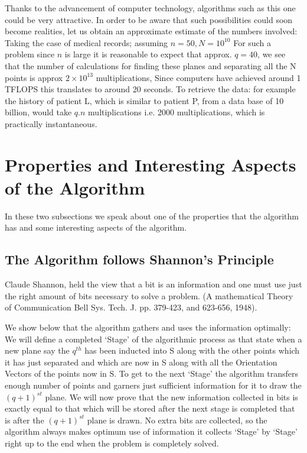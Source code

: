 \documentclass[english]{article}
\begin{document}
Thanks to the advancement of computer technology, algorithms such
as this one could be very attractive. In order to be aware that such
possibilities could soon become realities, let us obtain an approximate
estimate of the numbers involved: Taking the case of medical records;
assuming $n=50,N=10^{10}$ For such a problem since $n$ is large
it is reasonable to expect that approx. $q=40$, we see that the number
of calculations for finding these planes and separating all the N
points is approx $2\times10^{13}$ multiplications, Since computers
have achieved around 1 TFLOPS this translates to around 20 seconds.
To retrieve the data: for example the history of patient L, which
is similar to patient P, from a data base of 10 billion, would take
$q.n$ multiplications i.e. 2000 multiplications, which is practically
instantaneous.


\section{Properties and Interesting Aspects of the Algorithm}

In these two subsections we speak about one of the properties that
the algorithm has and some interesting aspects of the algorithm.


\subsection{The Algorithm follows Shannon's Principle}

Claude Shannon, held the view that a bit is an information and one
must use just the right amount of bits necessary to solve a problem.
(A mathematical Theory of Communication Bell Sys. Tech. J. pp. 379-423,
and 623-656, 1948).

We show below that the algorithm gathers and uses the information
optimally: We will define a completed `Stage' of the algorithmic process
as that state when a new plane say the $q^{th}$ has been inducted
into S along with the other points which it has just separated and
which are now in S along with all the Orientation Vectors of the points
now in S. To get to the next `Stage' the algorithm transfers enough
number of points and garners just sufficient information for it to
draw the $(q+1)^{st}$ plane. We will now prove that the new information
collected in bits is exactly equal to that which will be stored after
the next stage is completed that is after the $(q+1)^{st}$ plane
is drawn. No extra bits are collected, so the algorithm always makes
optimum use of information it collects `Stage' by `Stage' right up
to the end when the problem is completely solved.
\end{document}
